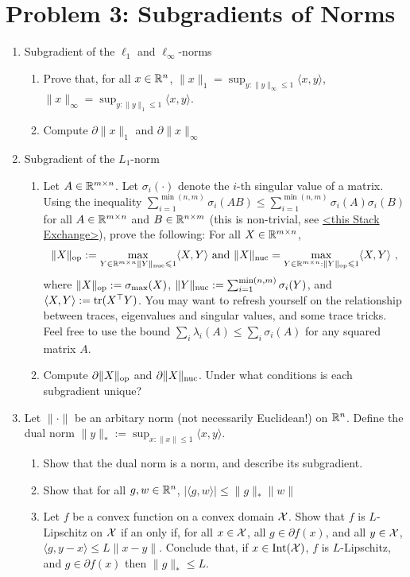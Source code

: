 \documentclass[12pt]{article}
\begin{document}
\section*{Problem 3: Subgradients of Norms}
\begin{enumerate}
\item Subgradient of the $\ell_1$ and $\ell_{\infty}$-norms
\begin{enumerate}
\item
Prove that, for all $x \in \mathbb{R}^n$, $\|x\|_1 = \sup_{y: \|y\|_{\infty} \le 1}\langle x, y \rangle$, $\|x\|_{\infty} = \sup_{y:\|y\|_1 \le 1}\langle x, y \rangle$. 
\item
Compute $\partial \|x\|_1$ and $\partial \|x\|_{\infty}$
\end{enumerate}
\item 
Subgradient of the $L_1$-norm
\begin{enumerate}
\item
Let $A \in \mathbb{R}^{m \times n}$. Let $\sigma_i(\cdot)$ denote the $i$-th singular value of a matrix. Using the inequality $\sum_{i=1}^{\min(n,m)}\sigma_i(AB) \le \sum_{i=1}^{\min(n,m)} \sigma_i(A)\sigma_i(B)$ for all $A \in \mathbb{R}^{m \times n}$ and $B \in \mathbb{R}^{n \times m}$ (this is non-trivial, see \href{<https://math.stackexchange.com/questions/1648542/proving-holders-inequality-for-schatten-norms>}{<this Stack Exchange>}), prove the following: For all $X \in \mathbb{R}^{m \times n}$, 
\begin{eqnarray}
\|X\|_{\mathrm{op}} :=  \max_{Y \in \mathbb{R}^{m \times n}  \|Y\|_{\mathrm{nuc}} \leqslant 1} \langle X, Y \rangle  \text{ and } \|X\|_{\mathrm{nuc}} =  \max_{Y \in \mathbb{R}^{m \times n} :\|Y\|_{\mathrm{op}} \leqslant 1} \langle X, Y \rangle ~,
\end{eqnarray}
where $\|X\|_{\mathrm{op}} := \sigma_{\max}(X)$, $ \|Y\|_{\mathrm{nuc}} := \sum_{i=1}^{\min(n,m)} \sigma_i(Y)$, and $\langle X, Y \rangle := \mathrm{tr}(X^\top Y)$. You may want to refresh yourself on the relationship between traces, eigenvalues and singular values, and some trace tricks. Feel free to use the bound $\sum_{i} \lambda_i (A) \le \sum_i \sigma_i(A)$ for any squared matrix $A$. 
\item
Compute $\partial \|X\|_{\mathrm{op}}$ and $\partial \|X\|_{\mathrm{nuc}}$. Under what conditions is each subgradient unique?
\end{enumerate}
\item 
Let  $\|\cdot\|$ be an arbitary norm (not necessarily Euclidean!)
on $\mathbb{R}^n$. Define the dual norm $\|y\|_* := \sup_{x: \|x\| \le 1}\langle x,y \rangle$. 
\begin{enumerate}
\item
Show that the dual norm is a norm, and describe its subgradient.
\item Show that for all $g,w \in \mathbb{R}^n$, $|\langle g, w \rangle| \le \|g\|_*\|w\|$
\item
Let $f$ be a convex function on a convex domain ${\cal X}$. Show that $f$ is $L$-Lipschitz on ${\cal X}$ if an only if, for all $x \in {\cal X}$, all $g \in \partial f(x)$, and all $y \in {\cal X}$, $\langle g, y-x \rangle \le L\|x-y\|$. Conclude that, if $x \in \mathrm{Int}({\cal X})$, $f$ is $L$-Lipschitz, and $g \in \partial f(x)$ then $\|g\|_* \le L$. 
\end{enumerate}
\end{enumerate}
\end{document}
